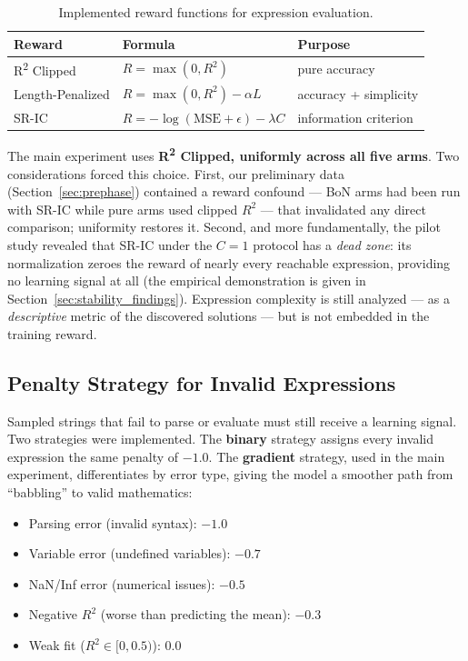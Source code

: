 \begin{table}[htbp]
    \centering
    \caption{Implemented reward functions for expression evaluation.}
    \label{tab:reward_functions}
    \begin{tabular}{lll}
    \toprule
    \textbf{Reward} & \textbf{Formula} & \textbf{Purpose} \\
    \midrule
    R\textsuperscript{2} Clipped & $R = \max(0, R^2)$ & pure accuracy \\
    Length-Penalized & $R = \max(0, R^2) - \alpha L$ & accuracy + simplicity \\
    SR-IC & $R = -\log(\text{MSE} + \epsilon) - \lambda C$ & information criterion \\
    \bottomrule
    \end{tabular}
\end{table}

The main experiment uses \textbf{R\textsuperscript{2} Clipped, uniformly across all five arms}. Two considerations forced this choice. First, our preliminary data (Section~\ref{sec:prephase}) contained a reward confound --- BoN arms had been run with SR-IC while pure arms used clipped $R^2$ --- that invalidated any direct comparison; uniformity restores it. Second, and more fundamentally, the pilot study revealed that SR-IC under the $C=1$ protocol has a \emph{dead zone}: its normalization zeroes the reward of nearly every reachable expression, providing no learning signal at all (the empirical demonstration is given in Section~\ref{sec:stability_findings}). Expression complexity is still analyzed --- as a \emph{descriptive} metric of the discovered solutions --- but is not embedded in the training reward.

\subsection{Penalty Strategy for Invalid Expressions}

Sampled strings that fail to parse or evaluate must still receive a learning signal. Two strategies were implemented. The \textbf{binary} strategy assigns every invalid expression the same penalty of $-1.0$. The \textbf{gradient} strategy, used in the main experiment, differentiates by error type, giving the model a smoother path from ``babbling'' to valid mathematics:

\begin{itemize}
    \item Parsing error (invalid syntax): $-1.0$
    \item Variable error (undefined variables): $-0.7$
    \item NaN/Inf error (numerical issues): $-0.5$
    \item Negative $R^2$ (worse than predicting the mean): $-0.3$
    \item Weak fit ($R^2 \in [0, 0.5)$): $0.0$
\end{itemize}

